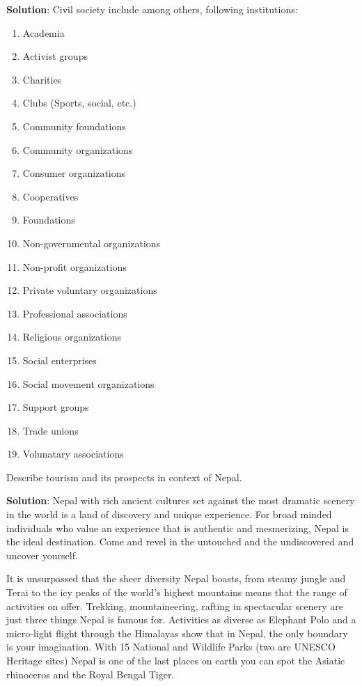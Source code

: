 \documentclass[
  openany]{book}
\newcommand{\question}{\item}
\newenvironment{solution}{ {\bfseries Solution}:}{}
\begin{document}
\begin{questions}
\begin{solution}
Civil society include among others, following institutions:

\begin{enumerate}
\item Academia
\item Activist groups
\item Charities
\item Clubs (Sports, social, etc.)
\item Community foundations
\item Community organizations
\item Consumer organizations
\item Cooperatives
\item Foundations
\item Non-governmental organizations
\item Non-profit organizations
\item Private voluntary organizations
\item Professional associations
\item Religious organizations
\item Social enterprises
\item Social movement organizations
\item Support groups
\item Trade unions
\item Volunatary associations
\end{enumerate}

\end{solution}

\question Describe tourism and its prospects in context of Nepal.

\begin{solution}
Nepal with rich ancient cultures set against the most dramatic scenery in the world is a land of discovery and unique experience. For broad minded individuals who value an experience that is authentic and mesmerizing, Nepal is the ideal destination. Come and revel in the untouched and the undiscovered and uncover yourself.

It is unsurpassed that the sheer diversity Nepal boasts, from steamy jungle and Terai to the icy peaks of the world’s highest mountains means that the range of activities on offer. Trekking, mountaineering, rafting in spectacular scenery are just three things Nepal is famous for. Activities as diverse as Elephant Polo and a micro-light flight through the Himalayas show that in Nepal, the only boundary is your imagination. With 15 National and Wildlife Parks (two are UNESCO Heritage sites) Nepal is one of the last places on earth you can spot the Asiatic rhinoceros and the Royal Bengal Tiger.


\end{solution}
\end{questions}
\end{document}
